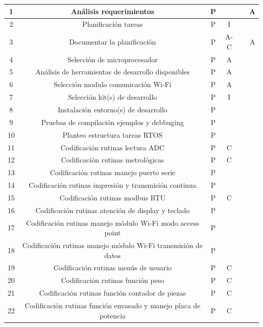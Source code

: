 \documentclass[11pt]{charter}
\begin{document}
\begin{table}[htpb]
{\begin{tabular}{|c|c|c|c|c|c|}
1 & Análisis requerimientos					         & P &  &  & A  \\ \hline
2 & Planificación tareas   					         & P & I&  &  \\ \hline
3 & Documentar la planificación				         & P & A-C&  & A \\ \hline
4 & Selección de microprocesador				         & P & A&  &  \\ \hline
5 & Análisis de herramientas de desarrollo disponibles & P & A&  &  \\ \hline 
6 & Selección modulo comunicación Wi-Fi		         & P & A&  &  \\ \hline
7 & Selección kit(s) de desarrollo                     & P & I&  &  \\ \hline
8 & Instalación entorno(s) de desarrollo               & P &  &  &  \\ \hline 
9 & Pruebas de compilación ejemplos y debbuging        & P &  &  &  \\ \hline
10 & Planteo estructura tareas RTOS                    & P &  &  &  \\ \hline
11 & Codificación rutinas lectura ADC                  & P & C&  &  \\ \hline
12 & Codificación rutinas metrológicas                 & P & C&  &  \\ \hline
13 & Codificación rutinas manejo puerto serie          & P &  &  &  \\ \hline
14 & Codificación rutinas impresión y transmisión continua          & P &  &  &  \\
15 & Codificación rutinas modbus RTU                                & P & C&  &  \\ \hline
16 & Codificación rutinas atención de display y teclado             & P &  &  &  \\ \hline
17 & Codificación rutinas manejo módulo Wi-Fi modo access point     & P &  &  &  \\ \hline
18 & Codificación rutinas manejo módulo Wi-Fi transmisión de datos  & P &  &  &  \\ \hline
19 & Codificación rutinas menús de usuario                          & P & C&  &  \\ \hline
20 & Codificación rutinas función peso                              & P & C&  &  \\ \hline
21 & Codificación rutinas función contador de piezas                & P & C&  &  \\ \hline
22 & Codificación rutinas función envasado y manejo placa de potencia & P & C &  &  \\ \hline

\end{tabular}}
\end{table}
\end{document}
